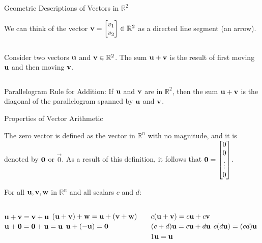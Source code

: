 \documentclass[xcolor=dvipsnames,aspectratio=169,t]{beamer}
\begin{document}
\begin{frame}{Geometric Descriptions of Vectors in $\mathbb{R}^2$}

{\small  We can think of the vector $\mathbf{v} = \begin{bmatrix} v_1 \\ v_2 \end{bmatrix} \in \mathbb{R}^2$ as a directed line segment (an arrow).}  %

  \begin{columns}
    
 \column{0.45\tw}
 {\small Consider two vectors $\mathbf{u}$ and $\mathbf{v} \in \mathbb{R}^2$. The sum $\mathbf{u} + \mathbf{v}$ is  the result of first moving $\mathbf{u}$ and then moving $\mathbf{v}$.}

  \end{columns}

\bbox
{\small  \alert{Parallelogram Rule for Addition:} If $\mathbf{u}$ and $\mathbf{v}$ are in $\mathbb{R}^2$, then the sum $\mathbf{u+v}$ is the diagonal of the parallelogram spanned by $\mathbf{u}$ and $\mathbf{v}$. }
 \ebox
  
\end{frame}

\begin{frame}{Properties of Vector Arithmetic}

  \bbox
  The \alert{zero vector} is defined as the vector in $\mathbb{R}^n$ with no magnitude, and it is denoted by $\mathbf{0}$ or $\vec{0}$. As a result of this definition, it follows that $\displaystyle \mathbf{0} = \begin{bmatrix} 0 \\ 0 \\ \vdots \\ 0 \end{bmatrix}$.
  \ebox
  \medskip
  
  \pause
  For all $\mathbf{u}, \mathbf{v}, \mathbf{w}$ in $\mathbb{R}^n$ and all scalars $c$ and $d$:

  \begin{columns}[T]
    \column{0.5\tw}
    \begin{enumerate}[(i)]
      \ii $\mathbf{u} + \mathbf{v} = \mathbf{v} + \mathbf{u}$
      \ii $(\mathbf{u} + \mathbf{v}) + \mathbf{w} = \mathbf{u} + (\mathbf{v} + \mathbf{w})$
      \ii $\mathbf{u} + \mathbf{0} = \mathbf{0} + \mathbf{u} = \mathbf{u}$
      \ii $\mathbf{u} + (-\mathbf{u}) = \mathbf{0}$
      \end{enumerate}

    \column{0.5\tw}
    \bb[(i)]
    \setcounter{enumi}{4}
    \ii $c(\mathbf{u}+\mathbf{v}) = c\mathbf{u}+c\mathbf{v}$
    \ii $(c+d) \mathbf{u} = c\mathbf{u} + d \mathbf{u}$
    \ii $c(d \mathbf{u}) = (cd) \mathbf{u}$
    \ii $1 \mathbf{u} = \mathbf{u}$
    \ee
  \end{columns}

  \end{frame}
\end{document}
